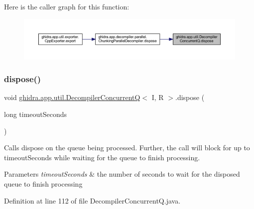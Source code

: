 Here is the caller graph for this function\+:
\nopagebreak
\begin{figure}[H]
\begin{center}
\leavevmode
\includegraphics[width=350pt]{classghidra_1_1app_1_1util_1_1_decompiler_concurrent_q_accb27b719bd48ed28ed813d36b84e98e_icgraph}
\end{center}
\end{figure}
\mbox{\label{classghidra_1_1app_1_1util_1_1_decompiler_concurrent_q_ab09db6eaa044cf9126f06f7d0d36f35d}} 
\subsubsection{\texorpdfstring{dispose()}{dispose()}\hspace{0.1cm}{\footnotesize\ttfamily [2/2]}}
{\footnotesize\ttfamily void \mbox{\hyperlink{classghidra_1_1app_1_1util_1_1_decompiler_concurrent_q}{ghidra.\+app.\+util.\+Decompiler\+ConcurrentQ}}$<$ I, R $>$.dispose (\begin{DoxyParamCaption}\item[{long}]{timeout\+Seconds }\end{DoxyParamCaption})\hspace{0.3cm}{\ttfamily [inline]}}

Calls dispose on the queue being processed. Further, the call will block for up to {\ttfamily timeout\+Seconds} while waiting for the queue to finish processing.


\begin{DoxyParams}{Parameters}
{\em timeout\+Seconds} & the number of seconds to wait for the disposed queue to finish processing \\
\hline
\end{DoxyParams}


Definition at line 112 of file Decompiler\+Concurrent\+Q.\+java.

\mbox{\label{classghidra_1_1app_1_1util_1_1_decompiler_concurrent_q_acf02756d2c1b9ab17c3871870601f76e}} 
